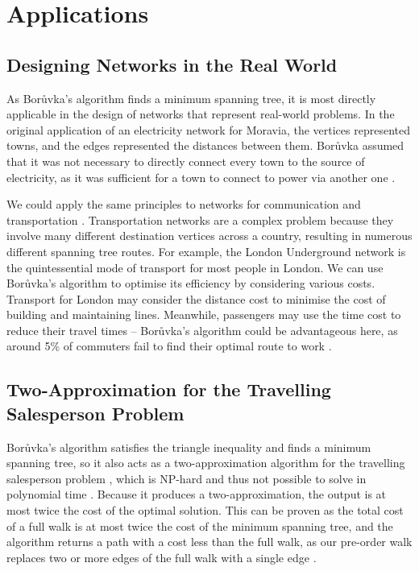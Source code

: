 \documentclass[a4paper, 11pt]{article}
\begin{document}
\section{Applications}

\subsection{Designing Networks in the Real World}
As Borůvka's algorithm finds a minimum spanning tree, it is most directly applicable in the design of networks that represent real-world problems. In the original application of an electricity network for Moravia, the vertices represented towns, and the edges represented the distances between them. Borůvka assumed that it was not necessary to directly connect every town to the source of electricity, as it was sufficient for a town to connect to power via another one \cite{nevsetvril2001otakar}.

We could apply the same principles to networks for communication and transportation \cite{graham1985history}. Transportation networks are a complex problem because they involve many different destination vertices across a country, resulting in numerous different spanning tree routes. For example, the London Underground network is the quintessential mode of transport for most people in London. We can use Borůvka's algorithm to optimise its efficiency by considering various costs. Transport for London may consider the distance cost to minimise the cost of building and maintaining lines. Meanwhile, passengers may use the time cost to reduce their travel times -- Borůvka's algorithm could be advantageous here, as around 5\% of commuters fail to find their optimal route to work \cite{larcom2017benefits}. 

\subsection{Two-Approximation for the Travelling Salesperson Problem}
Borůvka's algorithm satisfies the triangle inequality and finds a minimum spanning tree, so it also acts as a two-approximation algorithm for the travelling salesperson problem \cite{andreae1995performance}, which is NP-hard and thus not possible to solve in polynomial time \cite{junger1995traveling}. Because it produces a two-approximation, the output is at most twice the cost of the optimal solution. This can be proven as the total cost of a full walk is at most twice the cost of the minimum spanning tree, and the algorithm returns a path with a cost less than the full walk, as our pre-order walk replaces two or more edges of the full walk with a single edge \cite{andreae1995performance}.
\end{document}
